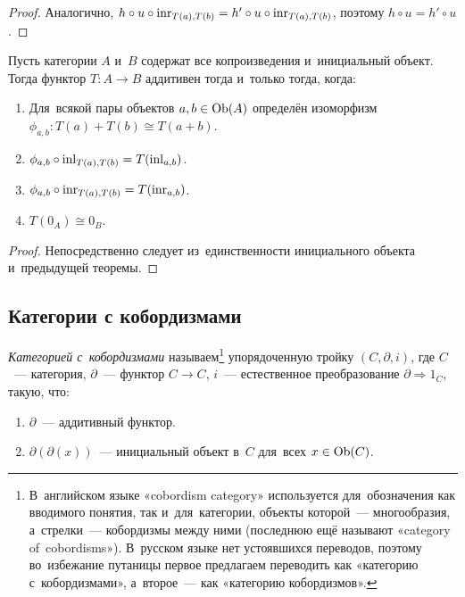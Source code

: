 \documentclass{article}
\begin{document}
\begin{proof}
    Аналогично, $h \circ u \circ \mathrm{inr}_{T(a), T(b)} = h' \circ u \circ \mathrm{inr}_{T(a), T(b)}$, поэтому $h \circ u = h' \circ u$.
\end{proof}

\begin{theorem*}
    Пусть категории $A$ и~$B$ содержат все копроизведения и~инициальный объект.
    Тогда функтор $T : A \rightarrow B$ аддитивен тогда и~только тогда, когда:
    \begin{enumerate}
        \item Для~всякой пары объектов $a, b \in \mathrm{Ob}(A)$ определён изоморфизм $\phi_{a, b} : T(a) + T(b) \cong T(a + b)$.
        \item $\phi_{a, b} \circ \mathrm{inl}_{T(a), T(b)} = T(\mathrm{inl}_{a, b})$.
        \item $\phi_{a, b} \circ \mathrm{inr}_{T(a), T(b)} = T(\mathrm{inr}_{a, b})$.
        \item $T(0_A) \cong 0_B$.
    \end{enumerate}
\end{theorem*}

\begin{proof}
    Непосредственно следует из~единственности инициального объекта и~предыдущей теоремы.
\end{proof}

\subsection{Категории с кобордизмами}

\textit{Категорией с~кобордизмами} называем\footnote{
    В~английском языке «cobordism category» используется для~обозначения как вводимого понятия,
    так и~для~категории, объекты которой~— многообразия, а~стрелки~— кобордизмы между ними (последнюю
    ещё называют «category of~cobordisms»). В~русском языке нет устоявшихся переводов, поэтому
    во~избежание путаницы первое предлагаем переводить как «категорию с~кобордизмами», а~второе~—
    как «категорию кобордизмов».
} упорядоченную тройку $(C, \partial, i)$, где $C$~— категория, $\partial$~— функтор $C \rightarrow C$,
$i$~— естественное преобразование $\partial \Rightarrow 1_C$, такую, что:
\begin{enumerate}
    \item $\partial$~— аддитивный функтор.
    \item $\partial(\partial(x))$~— инициальный объект в~$C$ для~всех $x \in \mathrm{Ob}(C)$.
\end{enumerate}
\end{document}
